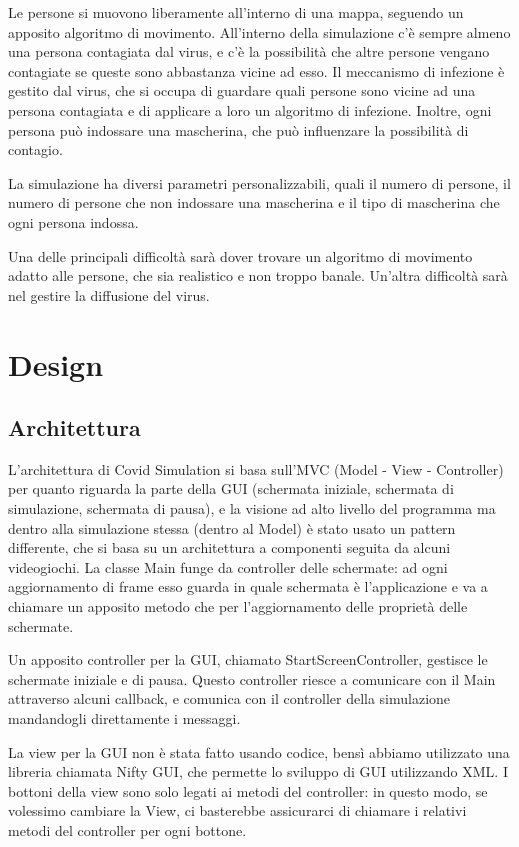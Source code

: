 Le persone si muovono liberamente all'interno di una mappa, seguendo un apposito algoritmo di movimento. All'interno della simulazione c'è sempre almeno una persona contagiata dal virus, e c'è la possibilità che altre persone vengano contagiate se queste sono abbastanza vicine ad esso. Il meccanismo di infezione è gestito dal virus, che si occupa di guardare quali persone sono vicine ad una persona contagiata e di applicare a loro un algoritmo di infezione. Inoltre, ogni persona può indossare una mascherina, che può influenzare la possibilità di contagio.

La simulazione ha diversi parametri personalizzabili, quali il numero di persone, il numero di persone che non indossare una mascherina e il tipo di mascherina che ogni persona indossa.

Una delle principali difficoltà sarà dover trovare un algoritmo di movimento adatto alle persone, che sia realistico e non troppo banale. Un'altra difficoltà sarà nel gestire la diffusione del virus.

\chapter{Design}

\section{Architettura}

L'architettura di Covid Simulation si basa sull'MVC (Model - View - Controller) per quanto riguarda la parte della GUI (schermata iniziale, schermata di simulazione, schermata di pausa), e la visione ad alto livello del programma ma dentro alla simulazione stessa (dentro al Model) è stato usato un pattern differente, che si basa su un architettura a componenti seguita da alcuni videogiochi.
La classe Main funge da controller delle schermate: ad ogni aggiornamento di frame esso guarda in quale schermata è l'applicazione e va a chiamare un apposito metodo che per l'aggiornamento delle proprietà delle schermate.

Un apposito controller per la GUI, chiamato StartScreenController, gestisce le schermate iniziale e di pausa. Questo controller riesce a comunicare con il Main attraverso alcuni callback, e comunica con il controller della simulazione mandandogli direttamente i messaggi.

La view per la GUI non è stata fatto usando codice, bensì abbiamo utilizzato una libreria chiamata Nifty GUI, che permette lo sviluppo di GUI utilizzando XML. I bottoni della view sono solo legati ai metodi del controller: in questo modo, se volessimo cambiare la View, ci basterebbe assicurarci di chiamare i relativi metodi del controller per ogni bottone.

